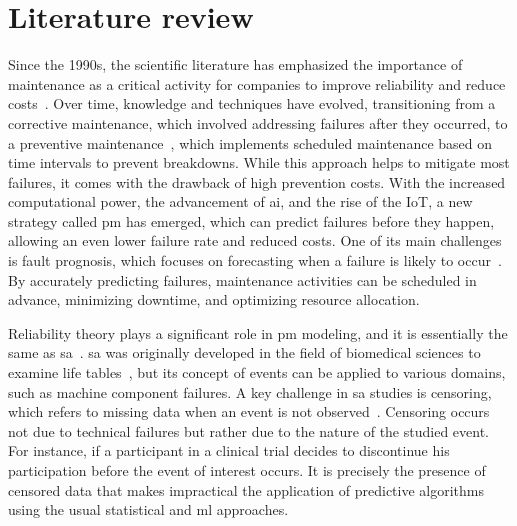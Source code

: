 \section{Literature review}

Since the 1990s, the scientific literature has emphasized the importance of maintenance as a critical activity for companies to improve reliability and reduce costs~\cite{Cho1991, Reinertsen1996}. Over time, knowledge and techniques have evolved, transitioning from a corrective maintenance, which involved addressing failures after they occurred, to a preventive maintenance~\cite{Ran2019}, which implements scheduled maintenance based on time intervals to prevent breakdowns. While this approach helps to mitigate most failures, it comes with the drawback of high prevention costs. With the increased computational power, the advancement of \ac{ai}, and the rise of the IoT, a new strategy called \ac{pm} has emerged, which can predict failures before they happen, allowing an even lower failure rate and reduced costs. One of its main challenges is fault prognosis, which focuses on forecasting when a failure is likely to occur~\cite{Wang2017_paradigm}. By accurately predicting failures, maintenance activities can be scheduled in advance, minimizing downtime, and optimizing resource allocation.

Reliability theory plays a significant role in \ac{pm} modeling, and it is essentially the same as \ac{sa}~\cite{Yang2022_prognostic}. \ac{sa} was originally developed in the field of biomedical sciences to examine life tables~\cite{Cox1972}, but its concept of events can be applied to various domains, such as machine component failures. A key challenge in \ac{sa} studies is censoring, which refers to missing data when an event is not observed~\cite{Leung1997, Gijbels2010}. Censoring occurs not due to technical failures but rather due to the nature of the studied event. For instance, if a participant in a clinical trial decides to discontinue his participation before the event of interest occurs. It is precisely the presence of censored data that makes impractical the application of predictive algorithms using the usual statistical and \ac{ml} approaches.

